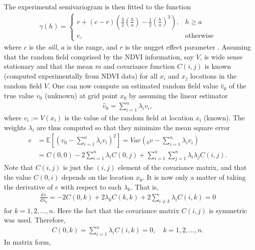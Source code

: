 \documentclass[10pt,letterpaper,conference]{ieeeconf}
\begin{document}
\noindent The experimental semivariogram is then fitted to the function
\begin{align*}
\gamma(h) = \left\{\begin{array}{rl} 
 r+ (c-r)\left( \frac{3}{2}\left(\frac{ h}{a}\right)- 
\frac{1}{2}\left(\frac{h}{a}\right)^3\right) , & h\ge a   \\ c, & 
\mbox{otherwise} \end{array}\right.
\end{align*}
where $c$ is the \emph{sill}, $a$ is the range, and $r$ is the nugget effect 
parameter \cite{Cressie_91}. 
Assuming that the random field comprised 
by the NDVI information, say $V$, is wide sense stationary and that
the mean $m$ and covariance function $C(i,j)$ is known (computed 
experimentally from NDVI data) for all $x_i$ and $x_j$ locations in the random 
field $V$. One can now compute an estimated random field value $\hat{v}_0$ 
of the true value $v_0$ (unknown) at grid point $x_0$ by assuming the linear 
estimator
\begin{align*}
\hat{v}_0 = \sum_{i=1}^n \lambda_i v_i,
\end{align*}
where $v_i:=V(x_i)$ is the value of the random field at location $x_i$ (known). 
The weights $\lambda_i$ are thus computed so that they minimize the mean square 
error 
\begin{align} \label{eq:min_MSE_kriging}
\nonumber e & = \mathbb{E}\left[\left(v_0 - \sum_{i=1}^n \lambda_i 
v_i\right)^2\right] = Var\left(_0v - \sum_{i=1}^n \lambda_i v_i \right) \\
  & = C(0,0)-2 \sum_{i=1}^n \lambda_i C(0,j) + \sum_{i=1}^n\sum_{j=1}^n 
\lambda_i \lambda_j C(i,j).
\end{align}
Note that $C(i,j)$ is just the $(i,j)$ element of the covariance matrix, and 
that the value $C(0,i)$ depends on the location $x_0$. It is now only a matter 
of taking the derivative of $e$ with respect to each $\lambda_k$. That is,
\begin{align*}
 \frac{d \,e}{d \lambda_k} = -2 C(0,k) +2\lambda_k C(k,k) + 2 \sum_{i\neq k} 
\lambda_i C(i,k) = 0  
\end{align*}
for $k=1,2, \ldots,n$. Here the fact that the covariance matrix 
$C(i,j)$ is symmetric was used. Therefore,
\begin{align*}
 C(0,k)=  \sum_{i=1}^n \lambda_i C(i,k) = 0, \quad k=1,2, \ldots,n.  
\end{align*}
In matrix form,
\end{document}
